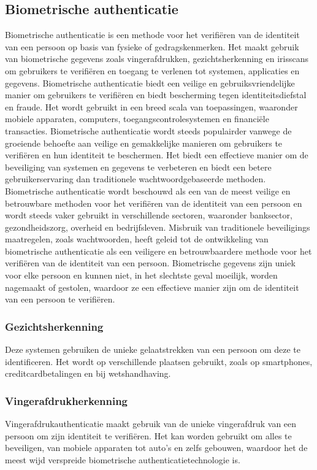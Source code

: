 \subsection{Biometrische authenticatie}%
\label{subsec:biometrische-authenticatie}
Biometrische authenticatie is een methode voor het verifiëren van de identiteit van een persoon op basis van fysieke of gedragskenmerken. Het maakt gebruik van biometrische gegevens zoals vingerafdrukken, gezichtsherkenning en irisscans om gebruikers te verifiëren en toegang te verlenen tot systemen, applicaties en gegevens. Biometrische authenticatie biedt een veilige en gebruiksvriendelijke manier om gebruikers te verifiëren en biedt bescherming tegen identiteitsdiefstal en fraude. Het wordt gebruikt in een breed scala van toepassingen, waaronder mobiele apparaten, computers, toegangscontrolesystemen en financiële transacties. Biometrische authenticatie wordt steeds populairder vanwege de groeiende behoefte aan veilige en gemakkelijke manieren om gebruikers te verifiëren en hun identiteit te beschermen. Het biedt een effectieve manier om de beveiliging van systemen en gegevens te verbeteren en biedt een betere gebruikerservaring dan traditionele wachtwoordgebaseerde methoden. Biometrische authenticatie wordt beschouwd als een van de meest veilige en betrouwbare methoden voor het verifiëren van de identiteit van een persoon en wordt steeds vaker gebruikt in verschillende sectoren, waaronder banksector, gezondheidszorg, overheid en bedrijfsleven.
\newline
\newline
Misbruik van traditionele beveiligings maatregelen, zoals wachtwoorden, heeft geleid tot de ontwikkeling van biometrische authenticatie als een veiligere en betrouwbaardere methode voor het verifiëren van de identiteit van een persoon. Biometrische gegevens zijn uniek voor elke persoon en kunnen niet, in het slechtste geval moeilijk, worden nagemaakt of gestolen, waardoor ze een effectieve manier zijn om de identiteit van een persoon te verifiëren.

\subsubsection{Gezichtsherkenning}%
\label{subsubsec:gezichtsherkenning}
Deze systemen gebruiken de unieke gelaatstrekken van een persoon om deze te identificeren. Het wordt op verschillende plaatsen gebruikt, zoals op smartphones, creditcardbetalingen en bij wetshandhaving.

\subsubsection{Vingerafdrukherkenning}%
\label{subsubsec:vingerafdrukherkenning}
Vingerafdrukauthenticatie maakt gebruik van de unieke vingerafdruk van een persoon om zijn identiteit te verifiëren. Het kan worden gebruikt om alles te beveiligen, van mobiele apparaten tot auto's en zelfs gebouwen, waardoor het de meest wijd verspreide biometrische authenticatietechnologie is.

